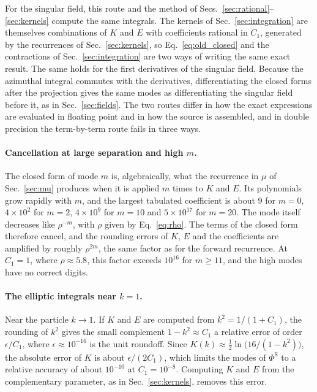 \documentclass[11pt]{article}
\newcommand{\PhiS}{\Phi^{\mathrm{S}}}
\begin{document}
For the singular field, this route and the method of
Secs.~\ref{sec:rational}--\ref{sec:kernels} compute the same integrals. The
kernels of Sec.~\ref{sec:integration} are themselves combinations of $K$ and
$E$ with coefficients rational in $C_1$, generated by the recurrences of
Sec.~\ref{sec:kernels}, so Eq.~\eqref{eq:old_closed} and the contractions of
Sec.~\ref{sec:integration} are two ways of writing the same exact result. The
same holds for the first derivatives of the singular field. Because the
azimuthal integral commutes with the derivatives, differentiating the closed
forms after the projection gives the same modes as differentiating the singular
field before it, as in Sec.~\ref{sec:fields}. The two routes differ in how the
exact expressions are evaluated in floating point and in how the source is
assembled, and in double precision the term-by-term route fails in three
ways.

\paragraph{Cancellation at large separation and high $m$.} The closed form of
mode $m$ is, algebraically, what the recurrence in $\mu$ of Sec.~\ref{sec:mu}
produces when it is applied $m$ times to $K$ and $E$. Its polynomials grow
rapidly with $m$, and the largest tabulated coefficient is about $9$ for
$m=0$, $4\times10^2$ for $m=2$, $4\times10^9$ for $m=10$ and $5\times10^{17}$
for $m=20$. The mode itself decreases like $\rho^{-m}$, with $\rho$ given by
Eq.~\eqref{eq:rho}. The terms of the closed form therefore cancel, and the
rounding errors of $K$, $E$ and the coefficients are amplified by roughly
$\rho^{2m}$, the same factor as for the forward recurrence. At $C_1=1$, where
$\rho\approx5.8$, this factor exceeds $10^{16}$ for $m\ge11$, and the high modes
have no correct digits.

\paragraph{The elliptic integrals near $k=1$.} Near the particle $k\to1$. If $K$
and $E$ are computed from $k^2=1/(1+C_1)$, the rounding of $k^2$ gives the small
complement $1-k^2\approx C_1$ a relative error of order $\epsilon/C_1$, where
$\epsilon\approx10^{-16}$ is the unit roundoff. Since
$K(k)\approx\tfrac12\ln\bigl(16/(1-k^2)\bigr)$, the absolute error of $K$ is
about $\epsilon/(2C_1)$, which limits the modes of $\PhiS$ to a relative
accuracy of about $10^{-10}$ at $C_1=10^{-8}$. Computing $K$ and $E$ from the
complementary parameter, as in Sec.~\ref{sec:kernels}, removes this error.
\end{document}
